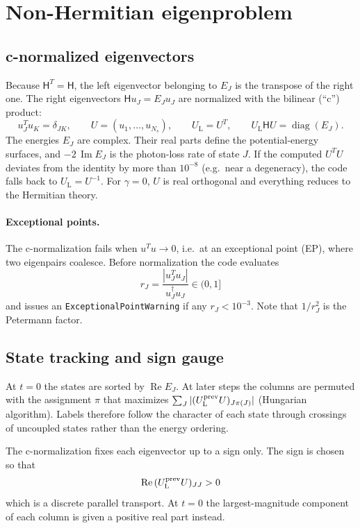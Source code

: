 \documentclass[11pt]{article}
\newcommand{\UL}{U_{\mathrm L}}
\newcommand{\Hm}{\mathsf{H}}
\newcommand{\Rep}{\operatorname{Re}}
\newcommand{\Imp}{\operatorname{Im}}
\newcommand{\code}[1]{\texttt{#1}}
\begin{document}
\section{Non-Hermitian eigenproblem}
\subsection{c-normalized eigenvectors}
Because $\Hm^T=\Hm$, the left eigenvector belonging to $E_J$ is the transpose of the right one. The right eigenvectors $\Hm u_J=E_Ju_J$ are normalized with the bilinear (``c'') product:
\begin{equation}
u_J^T u_K=\delta_{JK},\qquad U=(u_1,\dots,u_{N_s}),\qquad \UL=U^T,\qquad \UL\Hm U=\operatorname{diag}(E_J).
\label{eq:cnorm}
\end{equation}
The energies $E_J$ are complex. Their real parts define the potential-energy surfaces, and $-2\,\Imp E_J$ is the photon-loss rate of state $J$. If the computed $U^TU$ deviates from the identity by more than $10^{-8}$ (e.g.\ near a degeneracy), the code falls back to $\UL=U^{-1}$. For $\gamma=0$, $U$ is real orthogonal and everything reduces to the Hermitian theory.

\paragraph{Exceptional points.} The c-normalization fails when $u^Tu\to0$, i.e.\ at an exceptional point (EP), where two eigenpairs coalesce. Before normalization the code evaluates
\begin{equation}
r_J=\frac{|u_J^Tu_J|}{u_J^\dagger u_J}\in(0,1]
\end{equation}
and issues an \code{ExceptionalPointWarning} if any $r_J<10^{-3}$. Note that $1/r_J^2$ is the Petermann factor.

\subsection{State tracking and sign gauge}
\label{sec:track}
At $t=0$ the states are sorted by $\Rep E_J$. At later steps the columns are permuted with the assignment $\pi$ that maximizes $\sum_J|(\UL^{\rm prev}U)_{J\pi(J)}|$ (Hungarian algorithm). Labels therefore follow the character of each state through crossings of uncoupled states rather than the energy ordering.

The c-normalization fixes each eigenvector up to a sign only. The sign is chosen so that
\begin{equation}
\Rep\,(\UL^{\rm prev}U)_{JJ}>0
\end{equation}
which is a discrete parallel transport. At $t=0$ the largest-magnitude component of each column is given a positive real part instead.
\end{document}
